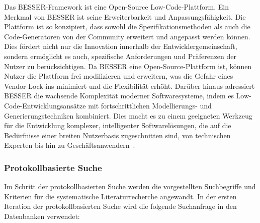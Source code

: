 


Das BESSER-Framework ist eine Open-Source Low-Code-Plattform. Ein Merkmal von BESSER ist seine Erweiterbarkeit 
und Anpassungsfähigkeit. Die Plattform ist so konzipiert, dass sowohl die 
Spezifikationsmethoden als auch die Code-Generatoren von der Community erweitert und angepasst werden können. Dies fördert 
nicht nur die Innovation innerhalb der Entwicklergemeinschaft, sondern ermöglicht es auch, spezifische Anforderungen und 
Präferenzen der Nutzer zu berücksichtigen. Da BESSER eine Open-Source-Plattform ist, können Nutzer die Plattform frei 
modifizieren und erweitern, was die Gefahr eines Vendor-Lock-ins minimiert und die Flexibilität erhöht.
Darüber hinaus adressiert BESSER die wachsende Komplexität moderner Softwaresysteme, indem es Low-Code-Entwicklungsansätze mit 
fortschrittlichen Modellierungs- und Generierungstechniken kombiniert. Dies macht es zu einem geeigneten Werkzeug für die Entwicklung 
komplexer, intelligenter Softwarelösungen, die auf die Bedürfnisse einer breiten Nutzerbasis 
zugeschnitten sind, von technischen Experten bis hin zu Geschäftsanwendern~\cite{alfonso2024building}.

\subsubsection{Protokollbasierte Suche}
Im Schritt der protokollbasierten Suche werden die vorgestellten Suchbegriffe und Kriterien für die systematische Literaturrecherche 
angewandt. In der ersten Iteration der protokollbasierten Suche wird die folgende Suchanfrage in den Datenbanken verwendet:

